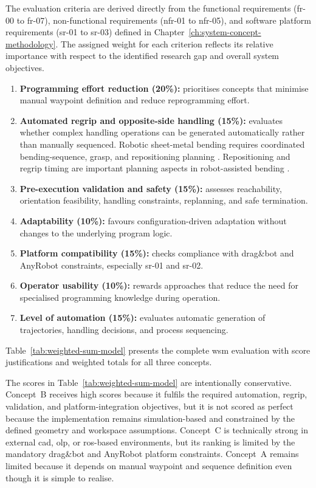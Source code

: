 \label{sec:evaluation-criteria-weights}

The evaluation criteria are derived directly from the functional requirements (\acs{fr}-00 to \acs{fr}-07), non-functional requirements (\acs{nfr}-01 to \acs{nfr}-05), and software platform requirements (\acs{sr}-01 to \acs{sr}-03) defined in Chapter~\ref{ch:system-concept-methodology}. The assigned weight for each criterion reflects its relative importance with respect to the identified research gap and overall system objectives.

\begin{enumerate}
\item \textbf{Programming effort reduction (20\%):} prioritises concepts that minimise manual waypoint definition and reduce reprogramming effort.
\item \textbf{Automated regrip and opposite-side handling (15\%):} evaluates whether complex handling operations can be generated automatically rather than manually sequenced. Robotic sheet-metal bending requires coordinated bending-sequence, grasp, and repositioning planning \cite{Gupta1998SheetMetalBending}. Repositioning and regrip timing are important planning aspects in robot-assisted bending \cite{Aomura2002RoboticBending}.
\item \textbf{Pre-execution validation and safety (15\%):} assesses reachability, orientation feasibility, handling constraints, replanning, and safe termination.
\item \textbf{Adaptability (10\%):} favours configuration-driven adaptation without changes to the underlying program logic.
\item \textbf{Platform compatibility (15\%):} checks compliance with drag\&bot and AnyRobot constraints, especially \acs{sr}-01 and \acs{sr}-02.
\item \textbf{Operator usability (10\%):} rewards approaches that reduce the need for specialised programming knowledge during operation.
\item \textbf{Level of automation (15\%):} evaluates automatic generation of trajectories, handling decisions, and process sequencing.
\end{enumerate}

\label{sec:weighted-sum-model-result}
Table~\ref{tab:weighted-sum-model} presents the complete \ac{wsm} evaluation with score justifications and weighted totals for all three concepts.


The scores in Table~\ref{tab:weighted-sum-model} are intentionally conservative. Concept~B receives high scores because it fulfils the required automation, regrip, validation, and platform-integration objectives, but it is not scored as perfect because the implementation remains simulation-based and constrained by the defined geometry and workspace assumptions. Concept~C is technically strong in external \acs{cad}, \acs{olp}, or \acs{ros}-based environments, but its ranking is limited by the mandatory drag\&bot and AnyRobot platform constraints. Concept~A remains limited because it depends on manual waypoint and sequence definition even though it is simple to realise.

